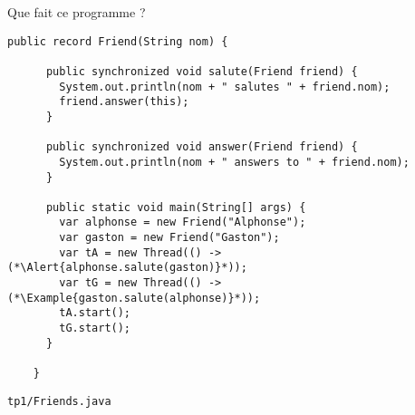 
\begingroup

\begin{frame}[fragile]{Que fait ce programme ?}

  \begin{lstlisting}[gobble=2]
    public record Friend(String nom) {
      
      public synchronized void salute(Friend friend) {
        System.out.println(nom + " salutes " + friend.nom);
        friend.answer(this);
      }
      
      public synchronized void answer(Friend friend) {
        System.out.println(nom + " answers to " + friend.nom);
      }
      
      public static void main(String[] args) {
        var alphonse = new Friend("Alphonse");
        var gaston = new Friend("Gaston");
        var tA = new Thread(() -> (*\Alert{alphonse.salute(gaston)}*));
        var tG = new Thread(() -> (*\Example{gaston.salute(alphonse)}*));
        tA.start();
        tG.start();
      }
      
    }
  \end{lstlisting}
  
  \begin{citing}
    \jitem \lstinline{tp1/Friends.java}
  \end{citing}

\end{frame}

\endgroup
\endinput
